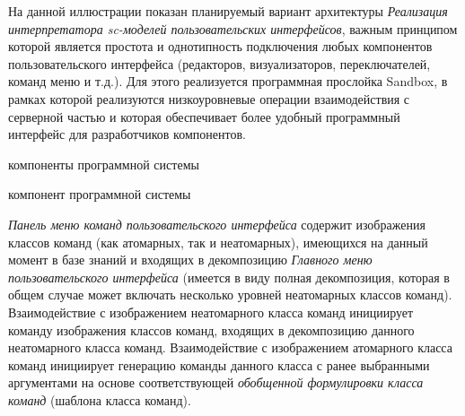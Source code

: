 На данной иллюстрации показан планируемый вариант архитектуры \textit{Реализация интерпретатора sc-моделей пользовательских
интерфейсов}, важным принципом которой является простота и однотипность подключения любых компонентов пользовательского
интерфейса (редакторов, визуализаторов, переключателей, команд меню и т.д.). Для этого реализуется программная прослойка
Sandbox, в рамках которой реализуются низкоуровневые операции взаимодействия с серверной частью и которая обеспечивает
более удобный программный интерфейс для разработчиков компонентов.

\begin{SCn}
\begin{scnrelfromlist}{компоненты программной системы}
    \begin{scnindent}
        \begin{scnrelfromlist}{компонент программной системы}
        \end{scnrelfromlist}
    \end{scnindent}
\end{scnrelfromlist}
\end{SCn}

\textit{Панель меню команд пользовательского интерфейса} содержит изображения классов команд (как атомарных, так и
неатомарных), имеющихся на данный момент в базе знаний и входящих в декомпозицию \textit{Главного меню пользовательского
интерфейса} (имеется в виду полная декомпозиция, которая в общем случае может включать несколько уровней неатомарных
классов команд). Взаимодействие с изображением неатомарного класса команд инициирует команду изображения классов
команд, входящих в декомпозицию данного неатомарного класса команд. Взаимодействие с изображением атомарного класса
команд инициирует генерацию команды данного класса с ранее выбранными аргументами на основе соответствующей
\textit{обобщенной формулировки класса команд} (шаблона класса команд).

